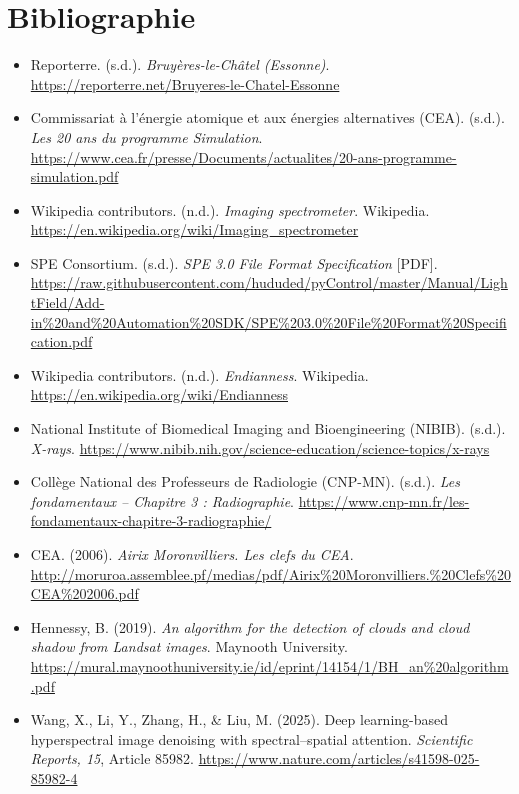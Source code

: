 \documentclass[12pt,a4paper]{report}
\begin{document}
\chapter{Bibliographie}
\begin{itemize}
    \item Reporterre. (s.d.). \textit{Bruyères-le-Châtel (Essonne)}. \url{https://reporterre.net/Bruyeres-le-Chatel-Essonne}

    \item Commissariat à l’énergie atomique et aux énergies alternatives (CEA). (s.d.). \textit{Les 20 ans du programme Simulation}. \url{https://www.cea.fr/presse/Documents/actualites/20-ans-programme-simulation.pdf}

    \item Wikipedia contributors. (n.d.). \textit{Imaging spectrometer}. Wikipedia. \url{https://en.wikipedia.org/wiki/Imaging_spectrometer}

    \item SPE Consortium. (s.d.). \textit{SPE 3.0 File Format Specification} [PDF]. \url{https://raw.githubusercontent.com/hududed/pyControl/master/Manual/LightField/Add-in%20and%20Automation%20SDK/SPE%203.0%20File%20Format%20Specification.pdf}

    \item Wikipedia contributors. (n.d.). \textit{Endianness}. Wikipedia. \url{https://en.wikipedia.org/wiki/Endianness}

    \item National Institute of Biomedical Imaging and Bioengineering (NIBIB). (s.d.). \textit{X-rays}. \url{https://www.nibib.nih.gov/science-education/science-topics/x-rays}

    \item Collège National des Professeurs de Radiologie (CNP-MN). (s.d.). \textit{Les fondamentaux – Chapitre 3 : Radiographie}. \url{https://www.cnp-mn.fr/les-fondamentaux-chapitre-3-radiographie/}

    \item CEA. (2006). \textit{Airix Moronvilliers. Les clefs du CEA}. \url{http://moruroa.assemblee.pf/medias/pdf/Airix%20Moronvilliers.%20Clefs%20CEA%202006.pdf}

    \item Hennessy, B. (2019). \textit{An algorithm for the detection of clouds and cloud shadow from Landsat images}. Maynooth University. \url{https://mural.maynoothuniversity.ie/id/eprint/14154/1/BH_an%20algorithm.pdf}

    \item Wang, X., Li, Y., Zhang, H., \& Liu, M. (2025). Deep learning-based hyperspectral image denoising with spectral–spatial attention. \textit{Scientific Reports, 15}, Article 85982. \url{https://www.nature.com/articles/s41598-025-85982-4}
\end{itemize}
\end{document}
